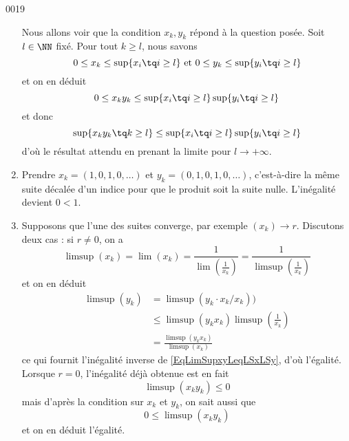 \begin{corrige}{0019}
\begin{enumerate}

Nous allons voir que la condition $x_k,y_k$ répond à la question posée. Soit $l \in \NN$ fixé. Pour tout $k \geq l$, nous savons
  \begin{equation*}
    0 \leq x_k \leq \sup\{ x_i \tq i \geq l\} \text{~et~} 0
    \leq y_k \leq \sup\{ y_i \tq i \geq l\}
  \end{equation*}
  et on en déduit%
  \begin{equation*}
    0 \leq x_k y_k \leq \sup\{ x_i \tq i \geq l\}  \sup\{ y_i \tq i \geq l\}
  \end{equation*}
  et donc
  \begin{equation*}
    \sup \{x_ky_k \tq k \geq l \} \leq \sup\{ x_i \tq i \geq l\}  \sup\{ y_i
    \tq i \geq l\}
  \end{equation*}
  d'où le résultat attendu en prenant la limite pour $l \rightarrow
  +\infty$.

\item Prendre $x_k = (1, 0, 1, 0, \ldots)$ et $y_k = (0, 1, 0, 1, 0,
  \ldots)$, c'est-à-dire la même suite décalée d'un indice pour que le
  produit soit la suite nulle. L'inégalité devient $0 < 1$.

\item 
Supposons que l'une des suites converge, par exemple $(x_k) \to r$. Discutons deux cas : si $r \neq 0$, on a
  \begin{equation}
    \limsup (x_k) = \lim (x_k) = \frac{1}{\lim(\frac{1}{x_k})} = \frac{1}{\limsup(\frac{1}{x_k})}
  \end{equation}
  et on en déduit
  \begin{equation}
    \begin{split}
      \limsup (y_k) &= \limsup(y_k \cdot x_k / x_k))\\
      &\leq \limsup(y_k x_k) \limsup \left(\frac1{x_k}\right)\\
      &= \frac{\limsup(y_k x_k)}{\limsup (x_k)}
    \end{split}
  \end{equation}
  ce qui fournit l'inégalité inverse de \eqref{EqLimSupxyLeqLSxLSy}, d'où l'égalité. Lorsque $r = 0$, l'inégalité déjà obtenue est en fait
  \begin{equation}
    \limsup (x_ky_k) \leq 0
  \end{equation}
  mais d'après la condition sur $x_k$ et $y_k$, on sait aussi que
  \begin{equation}
    0\leq\limsup (x_ky_k)
  \end{equation}
  et on en déduit l'égalité.
\end{enumerate}

\end{corrige}
